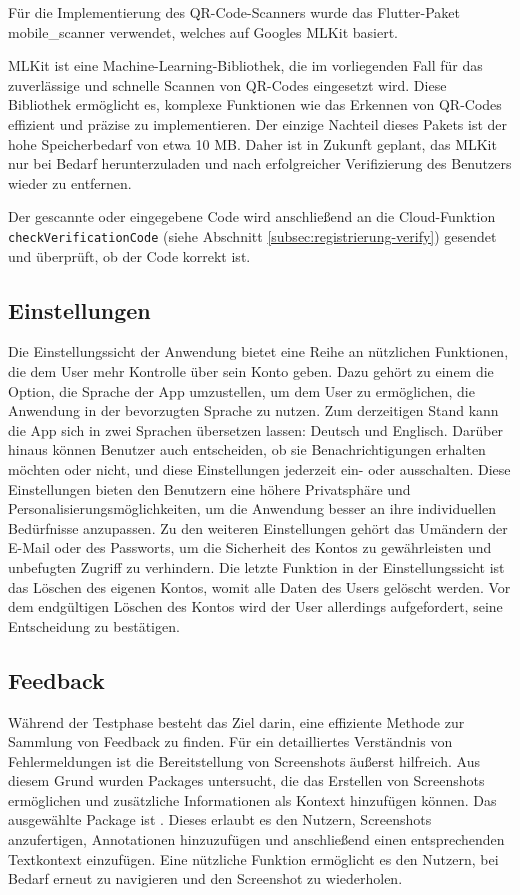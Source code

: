 Für die
Implementierung des QR-Code-Scanners wurde das Flutter-Paket
\cite{mobile_scanner} mobile\_scanner
verwendet, welches auf Googles MLKit \cite{googlemlkit}
basiert.

MLKit ist eine Machine-Learning-Bibliothek, die im
vorliegenden Fall für das zuverlässige und schnelle Scannen
von QR-Codes eingesetzt wird.
Diese Bibliothek ermöglicht es, komplexe Funktionen wie das Erkennen von QR-Codes effizient und präzise zu implementieren. Der einzige Nachteil dieses Pakets ist der hohe Speicherbedarf von etwa 10 MB. Daher ist in Zukunft geplant, das MLKit nur bei Bedarf herunterzuladen und nach erfolgreicher Verifizierung des Benutzers wieder zu entfernen.

Der gescannte oder eingegebene Code wird anschließend an die Cloud-Funktion \texttt{checkVerificationCode} (siehe Abschnitt \ref{subsec:registrierung-verify}) gesendet und überprüft, ob der Code korrekt ist.



\subsection{Einstellungen}
Die Einstellungssicht der Anwendung bietet eine Reihe an nützlichen Funktionen, die dem User mehr Kontrolle über sein Konto geben.
Dazu gehört zu einem die Option, die Sprache der App umzustellen, um dem User zu ermöglichen, die Anwendung in der bevorzugten Sprache zu nutzen. Zum derzeitigen Stand kann die App sich in zwei Sprachen übersetzen lassen: Deutsch und Englisch.
Darüber hinaus können Benutzer auch entscheiden, ob sie Benachrichtigungen erhalten möchten oder nicht, und diese Einstellungen jederzeit ein- oder ausschalten. Diese Einstellungen bieten den Benutzern eine höhere Privatsphäre und Personalisierungsmöglichkeiten, um die Anwendung besser an ihre individuellen Bedürfnisse anzupassen.
Zu den weiteren Einstellungen gehört das Umändern der E-Mail oder des Passworts, um die Sicherheit des Kontos zu gewährleisten und unbefugten Zugriff zu verhindern.
Die letzte Funktion in der Einstellungssicht ist das Löschen des eigenen Kontos, womit alle Daten des Users gelöscht werden. Vor dem endgültigen Löschen des Kontos wird der User allerdings aufgefordert, seine Entscheidung zu bestätigen.

\subsection{Feedback}
Während der Testphase besteht das Ziel darin, eine
effiziente Methode zur Sammlung von Feedback zu finden. Für
ein detailliertes Verständnis von Fehlermeldungen ist die
Bereitstellung von Screenshots äußerst hilfreich. Aus diesem
Grund wurden Packages untersucht, die das Erstellen von
Screenshots ermöglichen und zusätzliche Informationen als
Kontext hinzufügen können.
Das ausgewählte Package ist \cite{feedback}.
Dieses erlaubt es den Nutzern, Screenshots anzufertigen, Annotationen hinzuzufügen und anschließend einen entsprechenden Textkontext einzufügen. Eine nützliche Funktion ermöglicht es den Nutzern, bei Bedarf erneut zu navigieren und den Screenshot zu wiederholen.

